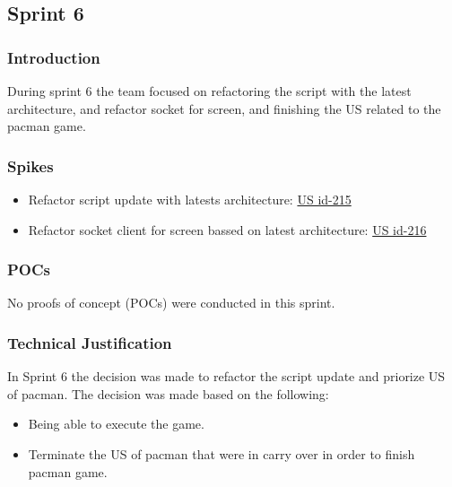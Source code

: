 \subsection{Sprint 6}

\subsubsection{Introduction}
During sprint 6 the team focused on refactoring the script with the latest architecture, and refactor socket for screen, and finishing the US related to the pacman game. 

\subsubsection{Spikes}

\begin{itemize}
    \item Refactor script update with latests architecture: \href{https://tree.taiga.io/project/joseluis-teran-coffeetime/us/215?milestone=396824}{US id-215}
    \item Refactor socket client for screen bassed on latest architecture: \href{https://tree.taiga.io/project/joseluis-teran-coffeetime/us/216?milestone=397461}{US id-216}
\end{itemize}

\subsubsection{POCs}

No proofs of concept (POCs) were conducted in this sprint.

\subsubsection{Technical Justification}
In Sprint 6 the decision was made to refactor the script update and priorize US of pacman. The decision was made based on the following:

\begin{itemize}
    \item  Being able to execute the game. 
    \item  Terminate the US of pacman that were in carry over in order to finish pacman game.
\end{itemize}

\newpage




